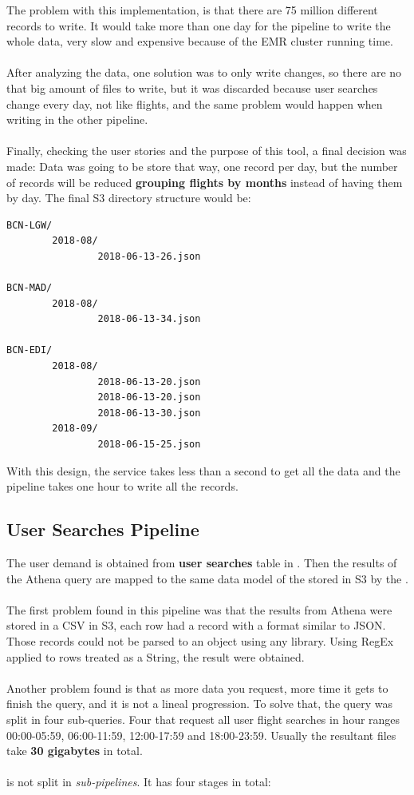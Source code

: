 The problem with this implementation, is that there are 75 million different records to write. It would take more than one day for the pipeline to write the whole data, very slow and expensive because of the EMR cluster running time.
\\\\
After analyzing the data, one solution was to only write changes, so there are no that big amount of files to write, but it was discarded because user searches change every day, not like flights, and the same problem would happen when writing in the other pipeline.
\\\\
Finally, checking the user stories and the purpose of this tool, a final decision was made: Data was going to be store that way, one record per day, but the number of records will be reduced \textbf{grouping flights by months} instead of having them by day. The final S3 directory structure would be:

\begin{verbatim}
BCN-LGW/
        2018-08/
                2018-06-13-26.json

BCN-MAD/
        2018-08/
                2018-06-13-34.json

BCN-EDI/
        2018-08/
                2018-06-13-20.json
                2018-06-13-20.json
                2018-06-13-30.json
        2018-09/
                2018-06-15-25.json
\end{verbatim}

With this design, the service takes less than a second to get all the data and the pipeline takes one hour to write all the records.


\subsection{User Searches Pipeline} \label{user-searches-pipeline}

The user demand is obtained from \textbf{user searches} table in . Then the results of the Athena query are mapped to the same data model of the stored in S3 by the .
\\\\
The first problem found in this pipeline was that the results from Athena were stored in a CSV\cite{csv} in S3, each row had a record with a format similar to JSON\cite{json}. Those records could not be parsed to an object using any library. Using RegEx\cite{regex} applied to rows treated as a String, the result were obtained.
\\\\
Another problem found is that as more data you request, more time it gets to finish the query, and it is not a lineal progression. To solve that, the query was split in four sub-queries. Four that request all user flight searches in hour ranges 00:00-05:59, 06:00-11:59, 12:00-17:59 and 18:00-23:59. Usually the resultant files take \textbf{30 gigabytes} in total.
\\\\
 is not split in \textit{sub-pipelines}. It has four stages in total:

